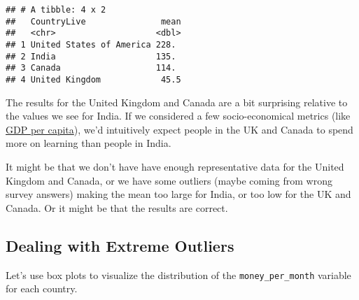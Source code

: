 \documentclass[
]{article}
\begin{document}
\begin{verbatim}
## # A tibble: 4 x 2
##   CountryLive               mean
##   <chr>                    <dbl>
## 1 United States of America 228. 
## 2 India                    135. 
## 3 Canada                   114. 
## 4 United Kingdom            45.5
\end{verbatim}

The results for the United Kingdom and Canada are a bit surprising
relative to the values we see for India. If we considered a few
socio-economical metrics (like \href{https://bit.ly/2I3cukh}{GDP per
capita}), we'd intuitively expect people in the UK and Canada to spend
more on learning than people in India.

It might be that we don't have have enough representative data for the
United Kingdom and Canada, or we have some outliers (maybe coming from
wrong survey answers) making the mean too large for India, or too low
for the UK and Canada. Or it might be that the results are correct.

\hypertarget{dealing-with-extreme-outliers}{%
\subsection{Dealing with Extreme
Outliers}\label{dealing-with-extreme-outliers}}

Let's use box plots to visualize the distribution of the
\texttt{money\_per\_month} variable for each country.
\end{document}
